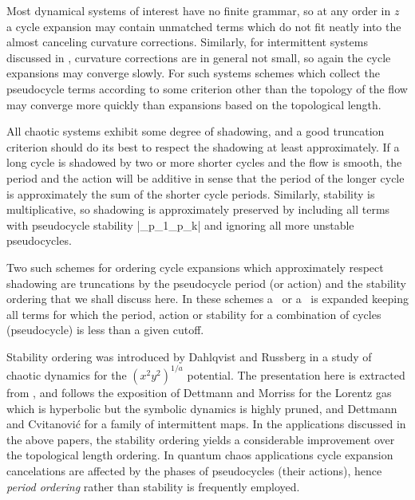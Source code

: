 

\noindent
{}
Most dynamical systems of interest have no finite grammar, so
at any order in $z$ a cycle
expansion may contain unmatched terms which do
not fit neatly into the almost canceling curvature corrections.
Similarly, for intermittent systems discussed
in \wwwcb,
curvature corrections are in general not small, so again the
cycle expansions may converge slowly.  For such systems
schemes which
collect the
pseudo\-cycle terms according to some criterion other
than the topology of the flow may converge
more quickly than expansions based on the topological length.

All chaotic systems exhibit some degree of shadowing, and a
good truncation criterion should do its best to respect the shadowing
at least approximately.
If a long cycle is
shadowed by two or more shorter cycles and the flow is smooth, the period
and the action will be additive in sense that the period of the longer cycle is
approximately the sum of the shorter cycle periods.  Similarly,
stability is multiplicative, so shadowing is approximately preserved
by including all terms with pseudocycle stability
\beq
\left|\ExpaEig_{p_1}\cdots\ExpaEig_{p_k}\right| \leq \stabCutoff
{}
and ignoring all more unstable pseudocycles.

Two such schemes for ordering cycle expansions which
approximately respect shadowing are truncations
by the pseudo\-cycle period (or action)
and the stability ordering
that we shall discuss here.  In these schemes a \dzeta\ or a
\fd\ is expanded keeping all terms for which the period, action or stability
for a combination of cycles (pseudocycle) is less than a given cutoff.


Stability ordering was introduced by
Dahlqvist and Russberg in a study of chaotic dynamics for the
$(x^2y^2)^{1/a}$ potential.
The presentation here is extracted from \wwwcb, and
follows the exposition of
Dettmann and Morriss for the Lorentz gas
which is hyperbolic but the symbolic dynamics is highly pruned, and
Dettmann and Cvitanovi\'c for a family of intermittent maps.
In
the
applications discussed in the above papers, the stability ordering
yields a considerable improvement over the topological length
ordering. In quantum chaos applications cycle expansion cancelations
are affected by the phases of pseudocycles (their actions), hence
{\em period ordering} rather than stability is frequently employed.

